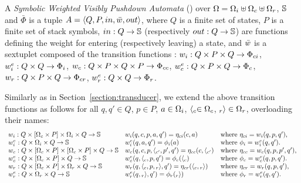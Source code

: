 \begin{definition}
A \emph{Symbolic Weighted Visibly Pushdown Automata} (\SWVPA)
over  $\Omega = \Omegai \uplus \Omegac \uplus \Omegar$, $\mathbb{S}$ and $\bar\Phi$
is a tuple $A = \< Q, P, \init, \bar\wei, \final >$,
where $Q$ is a finite set of states,
$P$ is a finite set of stack symbols,
$\mathsf{in} : Q \to \Semiring$
(respectively $\mathsf{out} : Q \to \Semiring$)
are functions defining the weight for entering
(respectively leaving) a state,
and $\bar\wei$ is a sextuplet composed of the transition functions :
$\weii : Q \times P \times Q \to \Phici$,
$\weiei : Q \times Q \to \Phii$,
$\weic : Q \times P \times Q \times P \to \Phicc$,
$\weiec : Q \times P \times Q \to \Phic$,
$\weir : Q \times P \times Q \to \Phicr$,
$\weier : Q \times Q \to \Phir$.
\end{definition}
%
Similarly as in Section~\ref{section:transducer},
we extend the above transition functions as follows
for all $q, q' \in Q$, $p \in P$,
$a \in \Omegai$,
$\call{c} \in \Omegac$,
$\return{r} \in \Omegar$,
overloading their names: %
\[
\begin{array}{lll}
\weii: Q \times [\Omegac \times P] \times \Omegai \times Q \to \Semiring &
\weii(q, c, p, a, q') = \eta_\mathsf{ci}(c, a) &
\mathrm{where~} \eta_\mathsf{ci} = \weii(q, p, q'),\\
%
\weiei: Q \times \Omegai \times Q \to \Semiring &
\weiei(q, a, q') = \phi_\mathsf{i}(a) &
\mathrm{where~} \phi_\mathsf{i} = \weiei(q, q').\\
%
\weic: Q \times [\Omegac \times P] \times  [\Omegac \times P] \times Q \to \Semiring &
\weic(q, c, p, \call{c'}, p', q') = \eta_\mathsf{cc}(c, \call{c'}) &
\mathrm{where~} \eta_\mathsf{cc} = \weic(q, p, p', q'),\\
%
\weiec: Q \times [\Omegac \times P] \times Q \to \Semiring &
\weiec(q, {\call{c}}, p, q') = \phi_\mathsf{c}({\call{c}}) &
\mathrm{where~} \phi_\mathsf{c} = \weiec(q, p, q').\\
%
\weir: Q \times [\Omegac \times P] \times \Omegar \times Q \to \Semiring &
\weir(q, {\call{c}},  p, {\return{r}}, q') = \eta_\mathsf{cr}({\call{c}},  {\return{r}}) &
\mathrm{where~} \eta_\mathsf{cr} = \weir(q, p, q'),\\
%
\weier: Q \times \Omegar \times Q \to \Semiring &
\weier(q, {\return{r}}, q') = \phi_\mathsf{r}({\return{r}}) &
\mathrm{where~} \phi_\mathsf{r} = \weier(q, q').\\
\end{array}
\]


